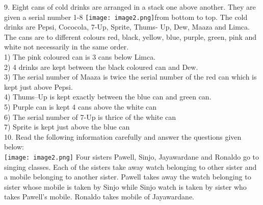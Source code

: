 \documentclass[
]{article}
\begin{document}
9. Eight cans of cold drinks are arranged in a stack one above another. They are given a serial
number 1-8 \texttt{[image: image2.png]}from bottom to top. The cold drinks are Pepsi, Cococola, 7-Up, Sprite, Thums-
Up, Dew, Maaza and Limca. The cans are to different colours red, black, yellow, blue,
purple, green, pink and white not necessarily in the same order.\\
1) The pink coloured can is 3 cans below Limca.\\
2) 4 drinks are kept between the black coloured can and Dew.\\
3) The serial number of Maaza is twice the serial number of the red can which is kept just
above Pepsi.\\
4) Thums–Up is kept exactly between the blue can and green can.\\
5) Purple can is kept 4 cans above the white can\\
6) The serial number of 7-Up is thrice of the white can\\
7) Sprite is kept just above the blue can\\

10. Read the following information carefully and answer the questions given below:\\
\texttt{[image: image2.png]}
Four sisters Pawell, Sinjo, Jayawardane and Ronaldo go to singing classes. Each of the
sisters take away watch belonging to other sister and a mobile belonging to another sister.
Pawell takes away the watch belonging to sister whose mobile is taken by Sinjo while Sinjo
watch is taken by sister who takes Pawell’s mobile. Ronaldo takes mobile of Jayawardane.\\
\end{document}
